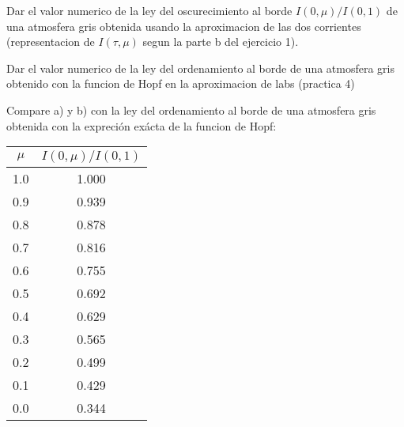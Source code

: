 \documentclass[12pt,spanish,a4paper]{practice}
\begin{document}
    \begin{problem}\label{prob:5}

        \begin{ppart}\label{prob:5:a}
            Dar el valor numerico de la ley del oscurecimiento al borde $I(0,\mu)/I(0,1)$ de una atmosfera gris obtenida usando la aproximacion de las dos corrientes (representacion de $I(\tau,\mu)$ segun la parte b del ejercicio 1).
        \end{ppart}

        \begin{ppart}\label{prob:5:b}
            Dar el valor numerico de la ley del ordenamiento al borde de una atmosfera gris obtenido con la funcion de Hopf en la aproximacion de labs (practica 4)    
        \end{ppart}
        
        \begin{ppart}\label{prob:5:c}
            Compare a) y b) con la ley del ordenamiento al borde de una atmosfera gris obtenida con la expreción exácta de la funcion de Hopf:

           
        \end{ppart}
            \begin{table}[h!]
            \centering
                \begin{tabular}{c|c} 
                     
                     $\mu$ & $I(0,\mu)/I(0,1)$ \\ [0.5ex] 
                     \hline
                     1.0 & 1.000   \\ 
                     0.9 & 0.939   \\
                     0.8 & 0.878  \\
                     0.7 & 0.816  \\
                     0.6 & 0.755  \\
                     0.5 & 0.692  \\
                     0.4 & 0.629  \\
                     0.3 & 0.565  \\
                     0.2 & 0.499  \\
                     0.1 & 0.429 \\
                     0.0 & 0.344 \\ [1ex] 
                     
                \end{tabular}
            \end{table}
        
    \end{problem}
\end{document}
